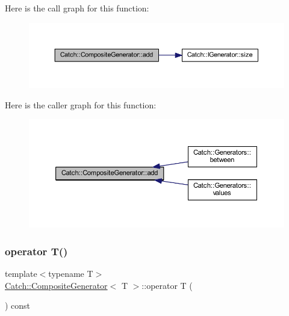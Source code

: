 Here is the call graph for this function\+:\nopagebreak
\begin{figure}[H]
\begin{center}
\leavevmode
\includegraphics[width=350pt]{class_catch_1_1_composite_generator_af3774d42ad2d3453d089ca599efe0517_cgraph}
\end{center}
\end{figure}
Here is the caller graph for this function\+:\nopagebreak
\begin{figure}[H]
\begin{center}
\leavevmode
\includegraphics[width=350pt]{class_catch_1_1_composite_generator_af3774d42ad2d3453d089ca599efe0517_icgraph}
\end{center}
\end{figure}
\hypertarget{class_catch_1_1_composite_generator_a83d6c941e2e735b9528e6e832f7b76e7}{}\label{class_catch_1_1_composite_generator_a83d6c941e2e735b9528e6e832f7b76e7} 
\subsubsection{\texorpdfstring{operator T()}{operator T()}}
{\footnotesize\ttfamily template$<$typename T$>$ \\
\hyperlink{class_catch_1_1_composite_generator}{Catch\+::\+Composite\+Generator}$<$ T $>$\+::operator T (\begin{DoxyParamCaption}{ }\end{DoxyParamCaption}) const\hspace{0.3cm}{\ttfamily [inline]}}




